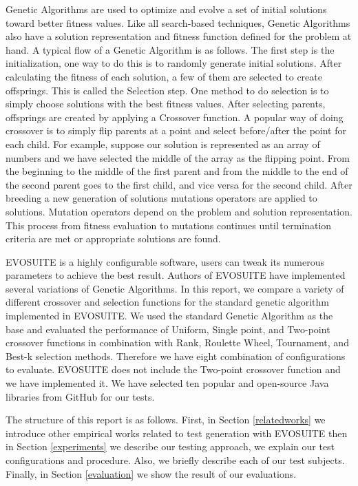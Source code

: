 \documentclass[sigconf]{acmart}
\begin{document}
Genetic Algorithms are used to optimize and evolve a set of initial solutions toward better fitness values.
Like all search-based techniques, Genetic Algorithms also have a solution representation and fitness function 
defined for the problem at hand. A typical flow of a Genetic Algorithm is as follows. 
The first step is the initialization, one way to do this is to randomly generate initial solutions. After calculating
the fitness of each solution, a few of them are selected to create offsprings. This is called 
the Selection step. One method to do selection is to simply choose solutions with the best fitness values.
After selecting parents, offsprings are created by applying a Crossover function. A popular way of doing crossover
is to simply flip parents at a point and select before/after the point for each child. For example, suppose
our solution is represented as an array of numbers and we have selected the middle of the array as the flipping point.
From the beginning to the middle of the first parent and from the middle to the end of
the second parent goes to the first child, and vice versa for the second child. After breeding a new generation of
solutions mutations operators are applied to solutions. Mutation operators depend on the problem and 
solution representation. This process from fitness evaluation to mutations continues until termination criteria
are met or appropriate solutions are found.

EVOSUITE is a highly configurable software, users can tweak its numerous parameters to achieve the best result. 
Authors of EVOSUITE have implemented several variations of Genetic Algorithms. In this report, we compare 
a variety of different crossover and selection functions for the standard genetic algorithm implemented in EVOSUITE.
We used the standard Genetic Algorithm as the base and evaluated the performance of 
Uniform, Single point, and Two-point crossover functions in combination with Rank, Roulette Wheel, Tournament, 
and Best-k selection methods. Therefore we have eight combination of configurations to evaluate. 
EVOSUITE does not include the Two-point crossover function and we have implemented it.
We have selected ten popular and open-source Java libraries from GitHub for our tests.

The structure of this report is as follows. First, in Section \ref{relatedworks} we introduce other
empirical works related to test generation with EVOSUITE then in Section \ref{experiments} we describe
our testing approach, we explain our test configurations and procedure. Also, we briefly describe each of
our test subjects. Finally, in Section \ref{evaluation} we show the result of our evaluations.
\end{document}
